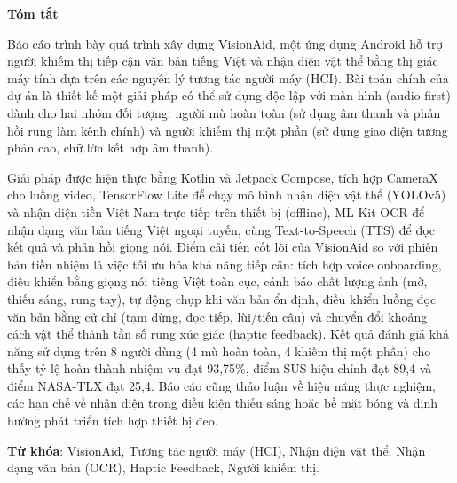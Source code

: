 \documentclass[a4paper,13pt]{report}
\begin{document}
\newpage\cleardoublepage

\begin{center}
\textbf{\large{Tóm tắt}}
\end{center}

Báo cáo trình bày quá trình xây dựng VisionAid, một ứng dụng Android hỗ trợ người khiếm thị tiếp cận văn bản tiếng Việt và nhận diện vật thể bằng thị giác máy tính dựa trên các nguyên lý tương tác người máy (HCI). Bài toán chính của dự án là thiết kế một giải pháp có thể sử dụng độc lập với màn hình (audio-first) dành cho hai nhóm đối tượng: người mù hoàn toàn (sử dụng âm thanh và phản hồi rung làm kênh chính) và người khiếm thị một phần (sử dụng giao diện tương phản cao, chữ lớn kết hợp âm thanh).

Giải pháp được hiện thực bằng Kotlin và Jetpack Compose, tích hợp CameraX cho luồng video, TensorFlow Lite để chạy mô hình nhận diện vật thể (YOLOv5) và nhận diện tiền Việt Nam trực tiếp trên thiết bị (offline), ML Kit OCR để nhận dạng văn bản tiếng Việt ngoại tuyến, cùng Text-to-Speech (TTS) để đọc kết quả và phản hồi giọng nói. Điểm cải tiến cốt lõi của VisionAid so với phiên bản tiền nhiệm là việc tối ưu hóa khả năng tiếp cận: tích hợp voice onboarding, điều khiển bằng giọng nói tiếng Việt toàn cục, cảnh báo chất lượng ảnh (mờ, thiếu sáng, rung tay), tự động chụp khi văn bản ổn định, điều khiển luồng đọc văn bản bằng cử chỉ (tạm dừng, đọc tiếp, lùi/tiến câu) và chuyển đổi khoảng cách vật thể thành tần số rung xúc giác (haptic feedback). Kết quả đánh giá khả năng sử dụng trên 8 người dùng (4 mù hoàn toàn, 4 khiếm thị một phần) cho thấy tỷ lệ hoàn thành nhiệm vụ đạt 93,75\%, điểm SUS hiệu chỉnh đạt 89,4 và điểm NASA-TLX đạt 25,4. Báo cáo cũng thảo luận về hiệu năng thực nghiệm, các hạn chế về nhận diện trong điều kiện thiếu sáng hoặc bề mặt bóng và định hướng phát triển tích hợp thiết bị đeo.

\vspace*{1cm}
\textbf{Từ khóa}: VisionAid, Tương tác người máy (HCI), Nhận diện vật thể, Nhận dạng văn bản (OCR), Haptic Feedback, Người khiếm thị.

\newpage\cleardoublepage

\newpage
{}
{
\small
\setlength{\cftbeforetoctitleskip}{-1em}
\setlength{\cftaftertoctitleskip}{0.5em}
\setlength{\cftbeforechapskip}{0.2em}
\setlength{\cftbeforesecskip}{0em}
\tableofcontents
}
\newpage\cleardoublepage

\newpage
{}
{
\setlength{\cftbeforetoctitleskip}{-1em}
\setlength{\cftaftertoctitleskip}{0.5em}
\setlength{\cftbeforechapskip}{0.2em}
\setlength{\cftbeforesecskip}{0em}
\listoffigures
}
\cleardoublepage
\end{document}
